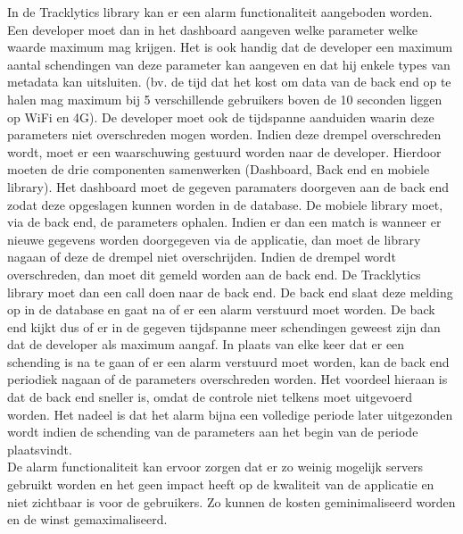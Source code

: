 In de Tracklytics library kan er een alarm functionaliteit aangeboden worden. Een developer moet dan in het dashboard aangeven welke parameter welke waarde maximum mag krijgen. Het is ook handig dat de developer een maximum aantal schendingen van deze parameter kan aangeven en dat hij enkele types van metadata kan uitsluiten. (bv. de tijd dat het kost om data van de back end op te halen mag maximum bij 5 verschillende gebruikers boven de 10 seconden liggen op WiFi en 4G). De developer moet ook de tijdspanne aanduiden waarin deze parameters niet overschreden mogen worden. Indien deze drempel overschreden wordt, moet er een waarschuwing gestuurd worden naar de developer. Hierdoor moeten de drie componenten samenwerken (Dashboard, Back end en mobiele library). Het dashboard moet de gegeven paramaters doorgeven aan de back end zodat deze opgeslagen kunnen worden in de database. De mobiele library moet, via de back end, de parameters ophalen. Indien er dan een match is wanneer er nieuwe gegevens worden doorgegeven via de applicatie, dan moet de library nagaan of deze de drempel niet overschrijden. Indien de drempel wordt overschreden, dan moet dit gemeld worden aan de back end. De Tracklytics library moet dan een call doen naar de back end. De back end slaat deze melding op in de database en gaat na of er een alarm verstuurd moet worden. De back end kijkt dus of er in de gegeven tijdspanne meer schendingen geweest zijn dan dat de developer als maximum aangaf. In plaats van elke keer dat er een schending is na te gaan of er een alarm verstuurd moet worden, kan de back end periodiek nagaan of de parameters overschreden worden. Het voordeel hieraan is dat de back end sneller is, omdat de controle niet telkens moet uitgevoerd worden. Het nadeel is dat het alarm bijna een volledige periode later uitgezonden wordt indien de schending van de parameters aan het begin van de periode plaatsvindt. \\

De alarm functionaliteit kan ervoor zorgen dat er zo weinig mogelijk servers gebruikt worden en het geen impact heeft op de kwaliteit van de applicatie en niet zichtbaar is voor de gebruikers. Zo kunnen de kosten geminimaliseerd worden en de winst gemaximaliseerd. 